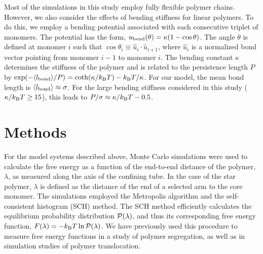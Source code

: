\documentclass[journal=mamobx,manuscript=article,layout=twocolumn]{achemso}
\begin{document}
Most of the simulations in this study employ fully flexible polymer chains.  However, 
we also consider the effects of bending stiffness for linear polymers. To do this, 
we employ a bending potential associated with each consecutive triplet
of monomers. The potential has the form, $u_{\rm bend}(\theta) = \kappa (1-\cos\theta)$.
The angle $\theta$ is defined at monomer $i$ such that 
$\cos\theta_i \equiv \hat{u}_{i}\cdot\hat{u}_{i+1}$,
where $\hat{u}_i$ is a normalized bond vector pointing from monomer $i-1$ to monomer $i$.
The bending constant $\kappa$ determines the stiffness of the polymer and is related
to the persistence length $P$ by $\exp(-\langle l_{\rm bond}\rangle/P) 
= \coth(\kappa/k_{\rm B}T) - k_{\rm B}T/\kappa$. For our model, 
the mean bond length is $\langle l_{\rm bond} \rangle \approx \sigma$. For the large bending
stiffness considered in this study ($\kappa/k_{\rm B}T \geq 15$), this leads to
$P/\sigma \approx \kappa/k_{\rm B}T - 0.5$.

\section{Methods}
\label{sec:methods}

For the model systems described above, Monte Carlo simulations were 
used to calculate the free energy as a function of the end-to-end distance of the polymer, 
$\lambda$, as measured along the axis of the confining tube. In the case of the star polymer, 
$\lambda$ is defined as the distance of the end of a selected arm to the core monomer. The 
simulations employed the Metropolis algorithm and the self-consistent histogram (SCH) 
method.\cite{frenkel2002understanding} 
The SCH method efficiently calculates the equilibrium probability distribution
${\cal P}(\lambda)$, and thus its corresponding free energy function,
$F(\lambda) = -k_{\rm B}T\ln {\cal P}(\lambda)$.
We have previously used this procedure to measure free energy functions in a
study of polymer segregation,\cite{polson2014polymer} as well as in simulation studies
of polymer translocation.\cite{polson2013simulation,polson2013polymer,polson2014evaluating,%
polson2015polymer}
\end{document}
